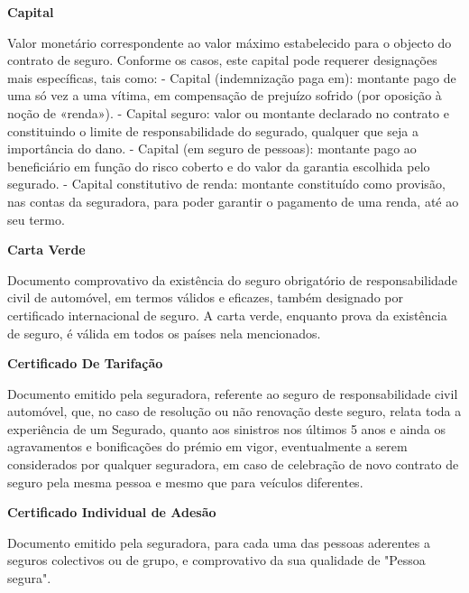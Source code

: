 \begin{description}
\item \textbf{Capital}

Valor monetário correspondente ao valor máximo estabelecido para o objecto do contrato de seguro. Conforme os casos, este capital pode requerer designações mais específicas, tais como: - Capital (indemnização paga em): montante pago de uma só vez a uma vítima, em compensação de prejuízo sofrido (por oposição à noção de «renda»). - Capital seguro: valor ou montante declarado no contrato e constituindo o limite de responsabilidade do segurado, qualquer que seja a importância do dano. - Capital (em seguro de pessoas): montante pago ao beneficiário em função do risco coberto e do valor da garantia escolhida pelo segurado. - Capital constitutivo de renda: montante constituído como provisão, nas contas da seguradora, para poder garantir o pagamento de uma renda, até ao seu termo.\end{description}

\begin{description}
\item \textbf{Carta Verde}

Documento comprovativo da existência do seguro obrigatório de responsabilidade civil de automóvel, em termos válidos e eficazes, também designado por certificado internacional de seguro. A carta verde, enquanto prova da existência de seguro, é válida em todos os países nela mencionados.
\end{description}

\begin{description}
\item \textbf{Certificado De Tarifação}

Documento emitido pela seguradora, referente ao seguro de responsabilidade civil automóvel, que, no caso de resolução ou não renovação deste seguro, relata toda a experiência de um Segurado, quanto aos sinistros nos últimos 5 anos e ainda os agravamentos e bonificações do prémio em vigor, eventualmente a serem considerados por qualquer seguradora, em caso de celebração de novo contrato de seguro pela mesma pessoa e mesmo que para veículos diferentes.
\end{description}

\begin{description}
\item \textbf{Certificado Individual de Adesão}

Documento emitido pela seguradora, para cada uma das pessoas aderentes a seguros colectivos ou de grupo, e comprovativo da sua qualidade de "Pessoa segura".
\end{description}

